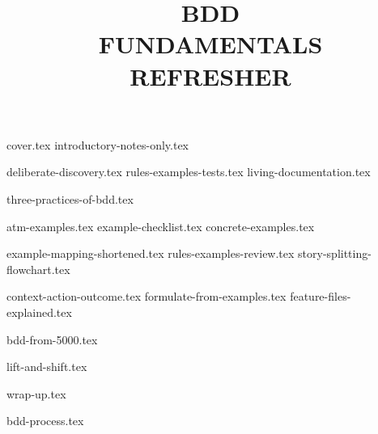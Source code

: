 \documentclass[a4paper,12pt]{report}
\title{BDD\\FUNDAMENTALS\\REFRESHER}
\begin{document}
{cover.tex}
{introductory-notes-only.tex}

{deliberate-discovery.tex}
{rules-examples-tests.tex}
{living-documentation.tex}

{three-practices-of-bdd.tex}


{atm-examples.tex}
{example-checklist.tex}
{concrete-examples.tex}

{example-mapping-shortened.tex}
{rules-examples-review.tex} 
{story-splitting-flowchart.tex} 


{context-action-outcome.tex}
{formulate-from-examples.tex}
{feature-files-explained.tex}

{bdd-from-5000.tex}

{lift-and-shift.tex}

{wrap-up.tex}

{bdd-process.tex}
\end{document}
